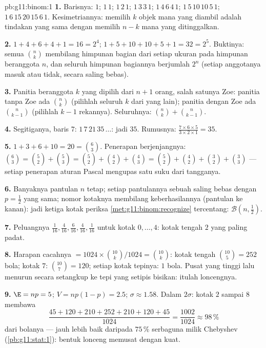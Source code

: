 \begin{solution}{pb:g11:binom:1}
\textbf{1.} Barisnya: $1$; $1\,1$; $1\,2\,1$; $1\,3\,3\,1$;
$1\,4\,6\,4\,1$; $1\,5\,10\,10\,5\,1$;
$1\,6\,15\,20\,15\,6\,1$. Kesimetriannya: memilih $k$ objek mana
yang diambil adalah tindakan yang sama dengan memilih $n - k$ mana yang
ditinggalkan.

\textbf{2.} $1 + 4 + 6 + 4 + 1 = 16 = 2^4$;
$1 + 5 + 10 + 10 + 5 + 1 = 32 = 2^5$. Buktinya: semua
$\binom nk$ membilang himpunan bagian dari setiap ukuran pada himpunan
beranggota $n$, dan seluruh himpunan bagiannya berjumlah $2^n$ (setiap
anggotanya masuk atau tidak, secara saling bebas).

\textbf{3.} Panitia beranggota $k$ yang dipilih dari $n + 1$ orang, salah
satunya Zoe: panitia tanpa Zoe ada $\binom nk$ (pilihlah seluruh
$k$ dari yang lain); panitia dengan Zoe ada $\binom{n}{k-1}$
(pilihlah $k - 1$ rekannya). Seluruhnya:
$\binom nk + \binom{n}{k-1}$.

\textbf{4.} Segitiganya, baris $7$: $1\,7\,21\,35\,\dots$: jadi $35$.
Rumusnya: $\frac{7 \times 6 \times 5}{3 \times 2 \times 1} =
35$.

\textbf{5.} $1 + 3 + 6 + 10 = 20 = \binom63$. Penerapan berjenjangnya:
$\binom63 = \binom52 + \binom53 = \binom52 + \binom42 +
\binom43 = \binom52 + \binom42 + \binom32 + \binom33$ ---
setiap penerapan aturan Pascal mengupas satu suku dari
tangganya.

\textbf{6.} Banyaknya pantulan $n$ tetap; setiap pantulannya sebuah
 saling bebas dengan $p = \frac12$ yang sama; nomor
kotaknya membilang keberhasilannya (pantulan ke kanan): jadi ketiga
kotak periksa \cref{met:g11:binom:recognize} tercentang:
$\mathcal B\!\left(n, \frac12\right)$.

\textbf{7.} Peluangnya $\frac{1}{16}, \frac{4}{16},
\frac{6}{16}, \frac{4}{16}, \frac{1}{16}$ untuk kotak
$0, \dots, 4$: kotak tengah $2$ yang paling padat.

\textbf{8.} Harapan cacahnya $= 1024 \times
\binom{10}{k}/1024 = \binom{10}{k}$: kotak tengah
$\binom{10}{5} = 252$ bola; kotak $7$: $\binom{10}{7} = 120$;
setiap kotak tepinya: $1$ bola. Pusat yang tinggi lalu menurun
secara setangkup ke tepi yang setipis bisikan: itulah loncengnya.

\textbf{9.} $\E = np = 5$; $V = np(1 - p) = 2.5$;
$\sigma \approx 1.58$. Dalam $2\sigma$: kotak $2$ sampai $8$
membawa
\[
\frac{45 + 120 + 210 + 252 + 210 + 120 + 45}{1024}
= \frac{1002}{1024} \approx 98\,\%
\]
dari bolanya --- jauh lebih baik
daripada $75\,\%$ serbaguna milik Chebyshev
(\cref{pb:g11:stat:1}): bentuk lonceng memusat dengan kuat.


\end{solution}
